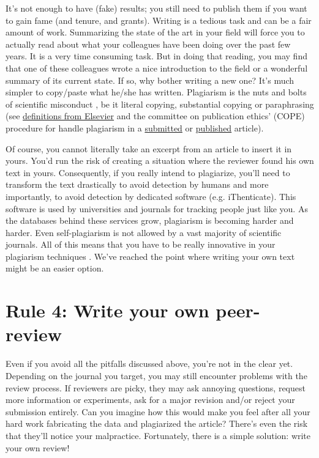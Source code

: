 \documentclass[a4paper,10pt,onecolumn]{article}
\begin{document}
It's not enough to have (fake) results; you still need to publish them if you want to gain fame (and tenure, and grants). Writing is a tedious task
and can be a fair amount of work. Summarizing the state of the art in your
field will force you to actually read about what your colleagues have been doing
over the past few years. It is a very time consuming task. But in doing that reading, you may find that one of these
colleagues wrote a nice introduction to the field or a wonderful summary of its current state. If so, why bother writing a new one? It's much simpler to copy/paste what he/she has written.  Plagiarism is the nuts and bolts of scientific misconduct
\citep{neuroskeptic:2017}, be it literal copying, substantial copying or
paraphrasing (see
\href{https://www.elsevier.com/editors/perk/plagiarism-complaints}{definitions
  from Elsevier} and the committee on publication ethics' (COPE) procedure for
handle plagiarism in a
\href{https://www.elsevier.com/__data/assets/pdf_file/0005/72815/plagiarism-A.pdf}{submitted}
or
\href{https://www.elsevier.com/__data/assets/pdf_file/0020/72830/plagiarism-B_0.pdf}{published}
article). 

Of course, you cannot literally take an excerpt from an
article to insert it in yours. You'd run the risk of creating a situation where the reviewer found his own text in yours. Consequently, if you
really intend to plagiarize, you'll need to transform the text drastically to
avoid detection by humans \citep{dorigo:2015} and more importantly, to avoid
detection by dedicated software (e.g. iThenticate). This software is used by
universities and journals for tracking people just like you. As the databases behind these services grow, plagiarism is becoming harder and harder. Even
self-plagiarism is not allowed by a vast majority of scientific journals. All of this means that you have to be really innovative in your plagiarism techniques \citep{long:2009}. We've reached the point where writing your own text might be an easier option.

\section*{Rule 4: Write your own peer-review}

Even if you avoid all the pitfalls discussed above, you're not in the clear yet. Depending on the
journal you target, you may still encounter problems with the review
process. If reviewers are picky, they may ask annoying questions,
request more information or experiments, ask for a major revision and/or reject your submission entirely. Can you imagine how this would make you feel after all your hard work
fabricating the data and plagiarized the article? There's even the risk that they'll notice your malpractice. Fortunately, there is a simple solution: write your
own review! 
\end{document}
